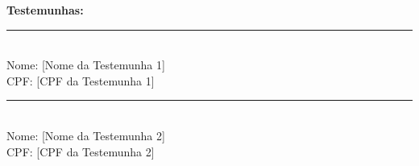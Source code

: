 \documentclass[12pt, a4paper]{article}
\begin{document}
\noindent\textbf{Testemunhas:}

\vspace{1cm}
\noindent
\begin{minipage}{0.45\textwidth}
    \rule{\textwidth}{0.4pt} \\
    Nome: [Nome da Testemunha 1] \\
    CPF: [CPF da Testemunha 1]
\end{minipage}
\hfill
\begin{minipage}{0.45\textwidth}
    \rule{\textwidth}{0.4pt} \\
    Nome: [Nome da Testemunha 2] \\
    CPF: [CPF da Testemunha 2]
\end{minipage}
\end{document}
